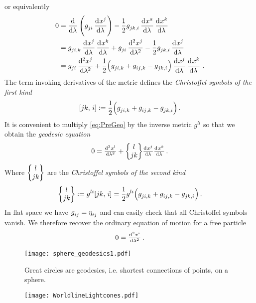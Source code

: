 or equivalently
\begin{equation}
\begin{split}
0
&=\dod{}{\lambda}\left(\tensor{g}{_j_i}\dod{\tensor{x}{^j}}{\lambda}\right)
-\frac{1}{2}\tensor{g}{_j_k_{,i}}\dod{x^a}{\lambda}
\dod{x^k}{\lambda}\\
&=\tensor{g}{_j_i_{,k}}\dod{\tensor{x}{^j}}{\lambda}\dod{\tensor{x}{^k}}{\lambda}
+\tensor{g}{_j_i}\dod[2]{\tensor{x}{^j}}{\lambda}
-\frac{1}{2}\tensor{g}{_j_k_{,i}}\dod{\tensor{x}{^j}}{\lambda}\\
&=\tensor{g}{_j_i}\dod[2]{\tensor{x}{^j}}{\lambda}
+\frac{1}{2}\left(\tensor{g}{_j_i_{,k}}+\tensor{g}{_i_j_{,k}}
-\tensor{g}{_j_k_{,i}}\right)\dod{\tensor{x}{^j}}{\lambda}
\dod{\tensor{x}{^k}}{\lambda}\label{eq:PreGeo}\,.
\end{split}
\end{equation}
The term invoking derivatives of the metric defines the \emph{Christoffel
symbols of the first kind}
\begin{equation}
    \csym{j}{k}{i}:=\frac{1}{2}
    \left(\tensor{g}{_j_i_{,k}}+\tensor{g}{_i_j_{,k}} -\tensor{g}{_j_k_{,i}}\right)\, .
\end{equation}
It is convenient to multiply \eqref{eq:PreGeo} by the inverse metric $g^{li}$ so
that we obtain the \emph{geodesic equation}
\begin{equation}
    0 =
    \od[2]{\tensor{x}{^l}}{\lambda}
    +\cSym{l}{j}{k}\od{\tensor{x}{^j}}{\lambda}\od{\tensor{x}{^k}}{\lambda}\,
    .\label{eq:geodeq}
\end{equation}
Where $\begin{Bmatrix} l \\ j k \end{Bmatrix}$ are the \emph{Christoffel symbols of the second kind}
\begin{equation}
    \cSym{l}{j}{k}:=g^{li}\csym{j}{k}{i}=\frac{1}{2}g^{li}
    \left(\tensor{g}{_j_i_{,k}}+\tensor{g}{_i_j_{,k}} -\tensor{g}{_j_k_{,i}}\right)\, .
\end{equation}
In flat space we have $\tensor{g}{_i_j}=\tensor{\eta}{_i_j}$ and can easily
check that all Christoffel symbols vanish. We therefore recover the ordinary equation of motion for a free particle
\begin{equation}
    0 = \od[2]{\tensor{x}{^i}}{\lambda}\, .
\end{equation}
\begin{figure}[hbtp!]
\centering
 \texttt{[image: sphere\_geodesics1.pdf]}
\caption{Great circles are geodesics, i.e. shortest connections of points, on
a sphere.}
\end{figure}
\begin{figure}[hbtp!]
\centering
 \texttt{[image: WorldlineLightcones.pdf]}
\caption{}
\end{figure}


